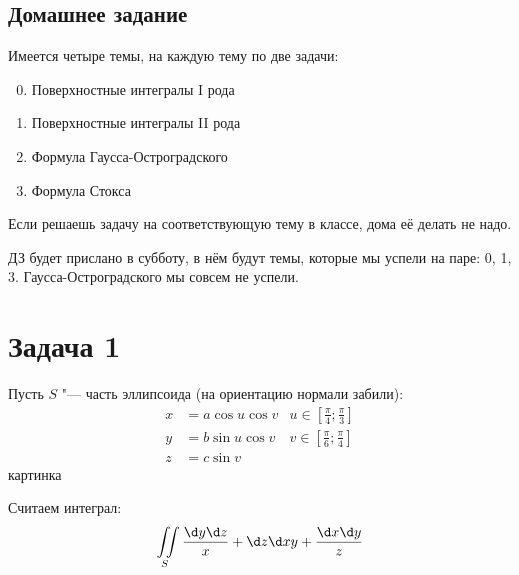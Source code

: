 \subsection{Домашнее задание}
Имеется четыре темы, на каждую тему по две задачи:
\begin{enumerate}
	\setcounter{enumi}{-1}
	\item Поверхностные интегралы I рода
	\item Поверхностные интегралы II рода
	\item Формула Гаусса-Остроградского
	\item Формула Стокса
\end{enumerate}
Если решаешь задачу на соответствующую тему в классе, дома её делать не надо.

ДЗ будет прислано в субботу, в нём будут темы, которые мы успели на паре: 0, 1, 3.
Гаусса-Остроградского мы совсем не успели.

\section{Задача 1}
	Пусть $S$ "--- часть эллипсоида (на ориентацию нормали забили):
	\begin{align*}
		x &= a \cos u \cos v & u \in \left[\frac \pi 4; \frac \pi 3 \right]\\
		y &= b \sin u \cos v & v \in \left[\frac \pi 6; \frac \pi 4 \right]\\
		z &= c \sin v
	\end{align*}
	\TODO картинка

	Считаем интеграл:
	\[ \iint\limits_S \frac{\d y \d z}{x} + {\d z \d x}{y} + \frac{\d x \d y}{z} \]

